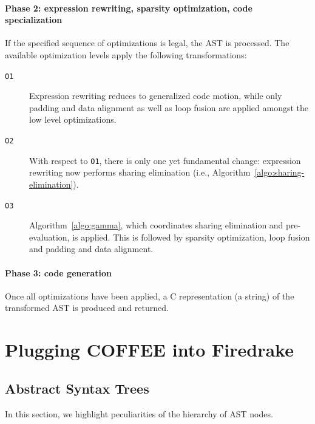 \paragraph{Phase 2: expression rewriting, sparsity optimization, code specialization}
If the specified sequence of optimizations is legal, the AST is processed. The available optimization levels apply the following transformations:
\begin{description}
\item[\texttt{O1}] Expression rewriting reduces to generalized code motion, while only padding and data alignment as well as loop fusion are applied amongst the low level optimizations.
\item[\texttt{O2}] With respect to \texttt{O1}, there is only one yet fundamental change: expression rewriting now performs sharing elimination (i.e., Algorithm~\ref{algo:sharing-elimination}).
\item[\texttt{O3}] Algorithm~\ref{algo:gamma}, which coordinates sharing elimination and pre-evaluation, is applied. This is followed by sparsity optimization, loop fusion and padding and data alignment.
\end{description}

\paragraph{Phase 3: code generation}
Once all optimizations have been applied, a C representation (a string) of the transformed AST is produced and returned.

\section{Plugging COFFEE into Firedrake}
\label{sec:coffee-implementation}

\subsection{Abstract Syntax Trees}
In this section, we highlight peculiarities of the hierarchy of AST nodes.

